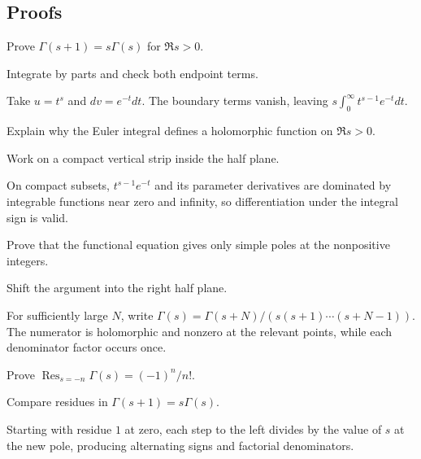 \subsection*{Proofs}

\begin{exercise}\label{exr:iv19-expand-06}
Prove \(\Gamma(s+1)=s\Gamma(s)\) for \(\Re s>0\).
\end{exercise}
\begin{hint}
Integrate by parts and check both endpoint terms.
\end{hint}
\begin{solution}
Take \(u=t^s\) and \(dv=e^{-t}dt\). The boundary terms vanish, leaving \(s\int_0^\infty t^{s-1}e^{-t}dt\).
\end{solution}

\begin{exercise}[Holomorphy]\label{exr:iv19-expand-07}
Explain why the Euler integral defines a holomorphic function on \(\Re s>0\).
\end{exercise}
\begin{hint}
Work on a compact vertical strip inside the half plane.
\end{hint}
\begin{solution}
On compact subsets, \(t^{s-1}e^{-t}\) and its parameter derivatives are dominated by integrable functions near zero and infinity, so differentiation under the integral sign is valid.
\end{solution}

\begin{exercise}\label{exr:iv19-expand-08}
Prove that the functional equation gives only simple poles at the nonpositive integers.
\end{exercise}
\begin{hint}
Shift the argument into the right half plane.
\end{hint}
\begin{solution}
For sufficiently large \(N\), write \(\Gamma(s)=\Gamma(s+N)/(s(s+1)\cdots(s+N-1))\). The numerator is holomorphic and nonzero at the relevant points, while each denominator factor occurs once.
\end{solution}

\begin{exercise}\label{exr:iv19-expand-09}
Prove \(\operatorname{Res}_{s=-n}\Gamma(s)=(-1)^n/n!\).
\end{exercise}
\begin{hint}
Compare residues in \(\Gamma(s+1)=s\Gamma(s)\).
\end{hint}
\begin{solution}
Starting with residue \(1\) at zero, each step to the left divides by the value of \(s\) at the new pole, producing alternating signs and factorial denominators.
\end{solution}

